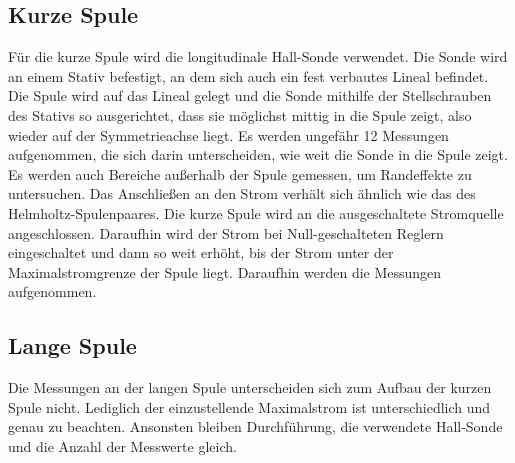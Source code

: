 \subsection{Kurze Spule}
Für die kurze Spule wird die longitudinale Hall-Sonde verwendet. Die Sonde wird an einem Stativ befestigt, an dem sich auch ein fest verbautes Lineal befindet.
Die Spule wird auf das Lineal gelegt und die Sonde mithilfe der Stellschrauben des Stativs so ausgerichtet, dass sie möglichst mittig in die Spule zeigt, also wieder auf der Symmetrieachse liegt.
Es werden ungefähr 12 Messungen aufgenommen, die sich darin unterscheiden, wie weit die Sonde in die Spule zeigt. Es werden auch Bereiche außerhalb der Spule gemessen, 
um Randeffekte zu untersuchen.
Das Anschließen an den Strom verhält sich ähnlich wie das des Helmholtz-Spulenpaares. Die kurze Spule wird an die ausgeschaltete Stromquelle angeschlossen. Daraufhin wird der Strom bei Null-geschalteten
Reglern eingeschaltet und dann so weit erhöht, bis der Strom unter der Maximalstromgrenze der Spule liegt.
Daraufhin werden die Messungen aufgenommen.

\subsection{Lange Spule}
Die Messungen an der langen Spule unterscheiden sich zum Aufbau der kurzen Spule nicht. Lediglich der einzustellende Maximalstrom ist unterschiedlich und genau zu beachten.
Ansonsten bleiben Durchführung, die verwendete Hall-Sonde und die Anzahl der Messwerte gleich.

